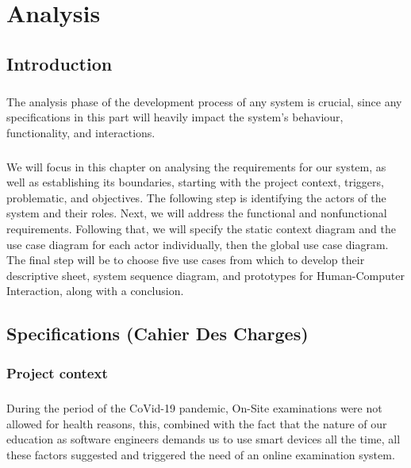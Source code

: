 \documentclass[]{uc2pfecaneva}
\title{}
\author{}
\begin{document}
	\setlength{\parskip}{6pts}

	\tableofcontents
	\listoffigures
	\listoftables
\chapter{Analysis}

\newpage

\raggedright\section{Introduction}
\paragraph{}
	The analysis phase of the development process of any system is crucial, since any specifications in this part will heavily impact the system's behaviour, functionality, and interactions.
\paragraph{}
	We will focus in this chapter on analysing the requirements for our system, as well as establishing its boundaries, starting with the project context, triggers, problematic, and objectives. The following step is identifying the actors of the system and their roles. Next, we will address the functional and nonfunctional requirements. Following that, we will specify the static context diagram and the use case diagram for each actor individually, then the global use case diagram. The final step will be to choose five use cases from which to develop their descriptive sheet, system sequence diagram, and prototypes for Human-Computer Interaction, along with a conclusion.

\raggedright\section{Specifications (Cahier Des Charges)}
\subsection{Project context}
\paragraph{}
	During the period of the CoVid-19 pandemic, On-Site examinations were not allowed for health reasons, this, combined with the fact that the nature of our education as software engineers demands us to use smart devices all the time, all these factors suggested and triggered the need of an online examination system.
\end{document}
